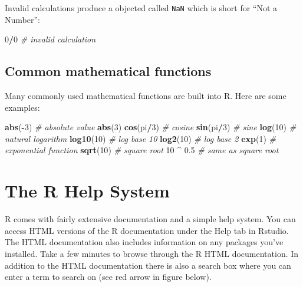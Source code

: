 \documentclass[]{book}
\newenvironment{Shaded}{\begin{snugshade}}{\end{snugshade}}
\newcommand{\CommentTok}[1]{\textcolor[rgb]{0.56,0.35,0.01}{\textit{#1}}}
\newcommand{\DecValTok}[1]{\textcolor[rgb]{0.00,0.00,0.81}{#1}}
\newcommand{\FloatTok}[1]{\textcolor[rgb]{0.00,0.00,0.81}{#1}}
\newcommand{\KeywordTok}[1]{\textcolor[rgb]{0.13,0.29,0.53}{\textbf{#1}}}
\newcommand{\NormalTok}[1]{#1}
\newcommand{\OperatorTok}[1]{\textcolor[rgb]{0.81,0.36,0.00}{\textbf{#1}}}
\newcommand{\StringTok}[1]{\textcolor[rgb]{0.31,0.60,0.02}{#1}}
\theoremstyle{definition}
\theoremstyle{definition}
\theoremstyle{definition}
\theoremstyle{remark}
\begin{document}
Invalid calculations produce a objected called \texttt{NaN} which is
short for ``Not a Number'':

\begin{Shaded}
\begin{Highlighting}[]
\DecValTok{0}\OperatorTok{/}\DecValTok{0}  \CommentTok{# invalid calculation}
\end{Highlighting}
\end{Shaded}

\hypertarget{common-mathematical-functions}{%
\subsection{Common mathematical
functions}\label{common-mathematical-functions}}

Many commonly used mathematical functions are built into R. Here are
some examples:

\begin{Shaded}
\begin{Highlighting}[]
\KeywordTok{abs}\NormalTok{(}\OperatorTok{-}\DecValTok{3}\NormalTok{)   }\CommentTok{# absolute value}
\KeywordTok{abs}\NormalTok{(}\DecValTok{3}\NormalTok{)}
\KeywordTok{cos}\NormalTok{(pi}\OperatorTok{/}\DecValTok{3}\NormalTok{) }\CommentTok{# cosine}
\KeywordTok{sin}\NormalTok{(pi}\OperatorTok{/}\DecValTok{3}\NormalTok{) }\CommentTok{# sine}
\KeywordTok{log}\NormalTok{(}\DecValTok{10}\NormalTok{)   }\CommentTok{# natural logarithm}
\KeywordTok{log10}\NormalTok{(}\DecValTok{10}\NormalTok{) }\CommentTok{# log base 10}
\KeywordTok{log2}\NormalTok{(}\DecValTok{10}\NormalTok{) }\CommentTok{# log base 2}
\KeywordTok{exp}\NormalTok{(}\DecValTok{1}\NormalTok{)    }\CommentTok{# exponential function}
\KeywordTok{sqrt}\NormalTok{(}\DecValTok{10}\NormalTok{)  }\CommentTok{# square root}
\DecValTok{10} \OperatorTok{^}\StringTok{ }\FloatTok{0.5}  \CommentTok{# same as square root}
\end{Highlighting}
\end{Shaded}

\hypertarget{the-r-help-system}{%
\section{The R Help System}\label{the-r-help-system}}

R comes with fairly extensive documentation and a simple help system.
You can access HTML versions of the R documentation under the Help tab
in Rstudio. The HTML documentation also includes information on any
packages you've installed. Take a few minutes to browse through the R
HTML documentation. In addition to the HTML documentation there is also
a search box where you can enter a term to search on (see red arrow in
figure below).
\end{document}
